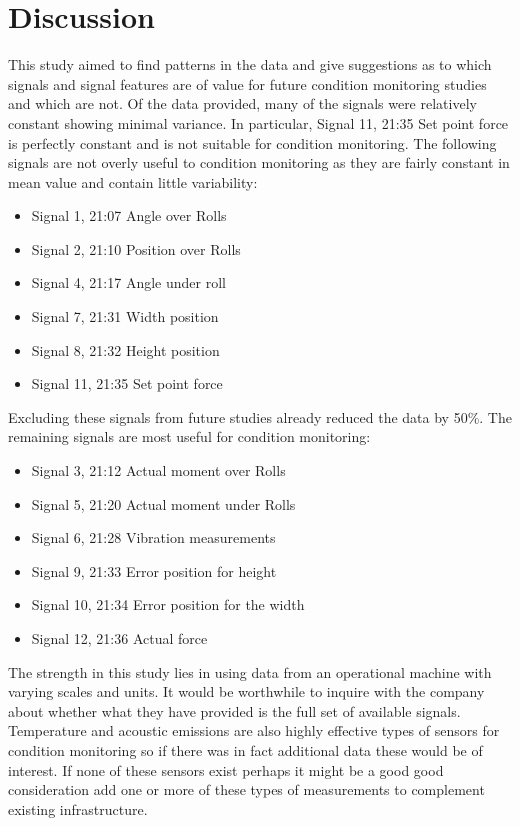 \documentclass[]{article}
\begin{document}
\clearpage 

\section{Discussion}
This study aimed to find patterns in the data and  give suggestions as to which signals and signal features are of value for future condition monitoring studies and which are not. Of the data provided, many of the signals were relatively constant showing minimal variance. In particular, Signal 11, 21:35 Set point force is perfectly constant and is not suitable for condition monitoring. The following signals are not overly useful to condition monitoring as they are fairly constant in mean value and contain little variability: 
\begin{itemize}
\item Signal 1, 21:07 Angle over Rolls
\item Signal 2, 21:10 Position over Rolls
\item Signal 4, 21:17 Angle under roll
\item Signal 7, 21:31 Width position
\item Signal 8, 21:32 Height position
\item Signal 11, 21:35 Set point force
\end{itemize}

Excluding these signals from future studies already reduced the data by 50\%. The remaining signals are most useful for condition monitoring:
\begin{itemize}
\item Signal 3, 21:12 Actual moment over Rolls
\item Signal 5, 21:20 Actual moment under Rolls
\item Signal 6, 21:28 Vibration measurements 
\item Signal 9, 21:33 Error position for height
\item Signal 10, 21:34 Error position for the width
\item Signal 12, 21:36 Actual force           
\end{itemize}

The strength in this study lies in using data from an operational machine with varying scales and units. It would be worthwhile to inquire with the company about whether what they have provided is the full set of available signals. Temperature and acoustic emissions are also highly effective types of sensors for condition monitoring so if there was in fact additional data these would be of interest. If none of these sensors exist perhaps it might be a good good consideration add one or more of these types of measurements to complement existing infrastructure.
\end{document}
